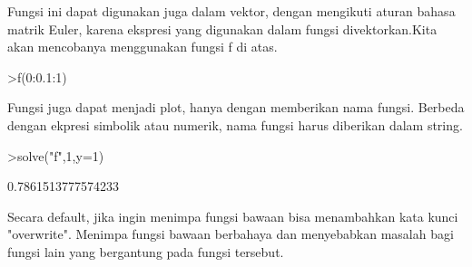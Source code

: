 \documentclass[a4paper,10pt]{article}
\begin{document}
\begin{eulernotebook}
\begin{eulercomment}
\begin{eulercomment}
\begin{eulercomment}
Fungsi ini dapat digunakan juga dalam vektor, dengan mengikuti aturan
bahasa matrik Euler, karena ekspresi yang digunakan dalam fungsi
divektorkan.Kita akan mencobanya menggunakan fungsi f di atas.
\end{eulercomment}
\begin{eulerprompt}
>f(0:0.1:1)
\end{eulerprompt}
\begin{euleroutput}
  [0,  0.1004987562112089,  0.2039607805437114,  0.3132091952673166,
  0.4308131845707604,  0.5590169943749475,  0.699714227381436,
  0.8544588931013591,  1.024499877989256,  1.210826164236634,
  1.414213562373095]
\end{euleroutput}
\begin{eulercomment}
Fungsi juga dapat menjadi plot, hanya dengan memberikan nama fungsi.
Berbeda dengan ekpresi simbolik atau numerik, nama fungsi harus
diberikan dalam string.
\end{eulercomment}
\begin{eulerprompt}
>solve("f",1,y=1)
\end{eulerprompt}
\begin{euleroutput}
  0.7861513777574233
\end{euleroutput}
\begin{eulercomment}
Secara default, jika ingin menimpa fungsi bawaan bisa menambahkan kata
kunci "overwrite". Menimpa fungsi bawaan berbahaya dan menyebabkan
masalah bagi fungsi lain yang bergantung pada fungsi tersebut.


\end{eulercomment}
\end{eulercomment}
\end{eulercomment}
\end{eulernotebook}
\end{document}

